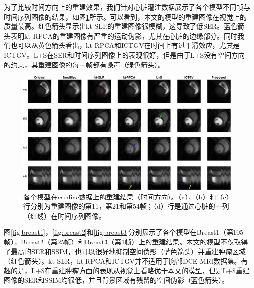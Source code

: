为了比较时间方向上的重建效果，我们针对心脏灌注数据展示了各个模型不同帧与时间序列图像的结果，如图\ref{fig:perfusion_frames}所示。可以看到，本文的模型的重建图像在视觉上的质量最高。红色箭头显示出kt-SLR的重建图像很模糊，这导致了低SER。蓝色箭头表明kt-RPCA的重建图像有严重的运动伪影，尤其在心脏的边缘部分。同时我们也可以从黄色箭头看出，kt-RPCA和ICTGV在时间上有过平滑效应，尤其是ICTGV。L+S在SER和时间序列图像上的表现很好，但是由于L+S没有空间方向的约束，其重建图像的每一帧都有噪声（绿色箭头）。
\begin{figure}
\centering
\includegraphics[width=1\textwidth]{img/tgvnn/figure4_perfusion_frames.eps}
\caption{各个模型在cardiac数据上的重建结果（时间方向）。（a）、（b）和（c）行分别为重建图像的第11，第21和第54帧；（d）行是通过心脏的一列（红线）在时间序列图像。}
\label{fig:perfusion_frames}
\end{figure}

图\ref{fig:breast1}，\ref{fig:breast2}和\ref{fig:breast3}分别展示了各个模型在Breast1（第105帧），Breast2（第25帧）和Breast3（第1帧）上的重建结果。本文的模型不仅取得了最高的SER和SSIM，也可以很好地抑制空间伪影（蓝色箭头）并重建肿瘤区域（红色箭头）。kt-SLR，kt-RPCA和ICTGV并不适用于胸部DCE-MRI数据集。有趣的是，L+S在重建肿瘤方面的表现从视觉上看略优于本文的模型，但是L+S重建图像的SER和SSIM均很低，并且背景区域有残留的空间伪影（蓝色箭头）。

